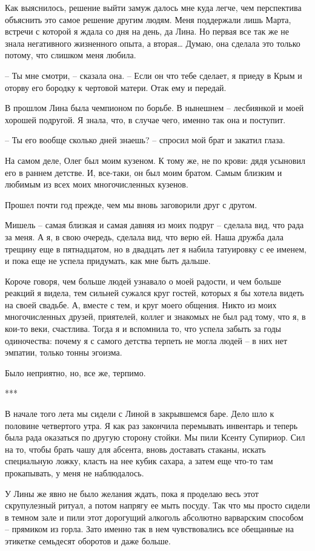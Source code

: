 \documentclass[
]{book}
\begin{document}
Как выяснилось, решение выйти замуж далось мне куда легче, чем перспектива объяснить это самое решение другим людям. Меня поддержали лишь Марта, встречи с которой я ждала со дня на день, да Лина. Но первая все так же не знала негативного жизненного опыта, а вторая\ldots{} Думаю, она сделала это только потому, что слишком меня любила.

-- Ты мне смотри, -- сказала она. -- Если он что тебе сделает, я приеду в Крым и оторву его бородку к чертовой матери. Отак ему и передай.

В прошлом Лина была чемпионом по борьбе. В нынешнем -- лесбиянкой и моей хорошей подругой. Я знала, что, в случае чего, именно так она и поступит.

-- Ты его вообще сколько дней знаешь? -- спросил мой брат и закатил глаза.

На самом деле, Олег был моим кузеном. К тому же, не по крови: дядя усыновил его в раннем детстве. И, все-таки, он был моим братом. Самым близким и любимым из всех моих многочисленных кузенов.

Прошел почти год прежде, чем мы вновь заговорили друг с другом.

Мишель -- самая близкая и самая давняя из моих подруг -- сделала вид, что рада за меня. А я, в свою очередь, сделала вид, что верю ей. Наша дружба дала трещину еще в пятнадцатом, но в двадцать лет я набила татуировку с ее именем, и пока еще не успела придумать, как мне быть дальше.

Короче говоря, чем больше людей узнавало о моей радости, и чем больше реакций я видела, тем сильней сужался круг гостей, которых я бы хотела видеть на своей свадьбе. А, вместе с тем, и круг моего общения. Никто из моих многочисленных друзей, приятелей, коллег и знакомых не был рад тому, что я, в кои-то веки, счастлива. Тогда я и вспомнила то, что успела забыть за годы одиночества: почему я с самого детства терпеть не могла людей -- в них нет эмпатии, только тонны эгоизма.

Было неприятно, но, все же, терпимо.

***

В начале того лета мы сидели с Линой в закрывшемся баре. Дело шло к половине четвертого утра. Я как раз закончила перемывать инвентарь и теперь была рада оказаться по другую сторону стойки. Мы пили Ксенту Супириор. Сил на то, чтобы брать чашу для абсента, вновь доставать стаканы, искать специальную ложку, класть на нее кубик сахара, а затем еще что-то там прокапывать, у меня не наблюдалось.

У Лины же явно не было желания ждать, пока я проделаю весь этот скрупулезный ритуал, а потом напрягу ее мыть посуду. Так что мы просто сидели в темном зале и пили этот дорогущий алкоголь абсолютно варварским способом -- прямиком из горла. Зато именно так в нем чувствовались все обещанные на этикетке семьдесят оборотов и даже больше.
\end{document}
